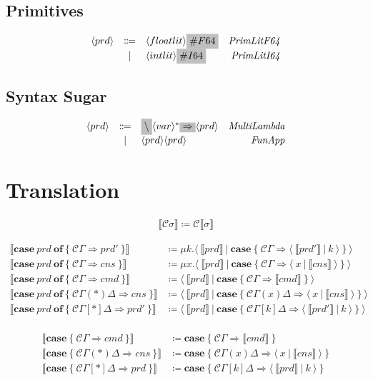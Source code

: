 \documentclass[11pt]{article}
\newcommand{\translate}[1]{\llbracket #1 \rrbracket}
\newcommand{\C}{\mathcal{C}}
\newcommand{\case}[1]{\mathbf{case}\ \{\ #1\ \}}
\newcommand{\caseof}[2]{\mathbf{case}\ #1\ \mathbf{of}\ \{\ #2\ \}}
\newcommand{\pat}[1]{\C\Gamma \Rightarrow #1 }
\newcommand{\prdpat}[2]{\C\Gamma(#1)\Delta \Rightarrow #2 }
\newcommand{\cnspat}[2]{\C\Gamma[#1]\Delta \Rightarrow #2 }
\newcommand{\nonterminal}[1]{\langle #1 \rangle}
\newcommand{\terminal}[1]{\colorbox{lightgray}{#1}}
\newcommand{\cut}[2]{\langle\ #1\ |\ #2\ \rangle}
\begin{document}
\subsection{Primitives}
\[
  \begin{array}{lclr}
    \nonterminal{prd} & \Coloneqq & \nonterminal{floatlit}\terminal{$\#F64$} & \emph{PrimLitF64} \\
    & | & \nonterminal{intlit}\terminal{$\#I64$} & \emph{PrimLitI64}
  \end{array}
\]
\subsection{Syntax Sugar}

\[
  \begin{array}{lclr}
    \nonterminal{prd} & \Coloneqq & \terminal{$\backslash$} \nonterminal{var}^{\ast}\terminal{$\Rightarrow$} \nonterminal{prd} & \emph{MultiLambda} \\
    & | & \nonterminal{prd} \nonterminal{prd} & \emph{FunApp}
  \end{array}
\]

\section{Translation}

\begin{align*}
  \translate{\C\sigma} \coloneqq \C\translate{\sigma}
\end{align*}

\begin{align*}
  \translate{\caseof{prd}{\pat{prd'}}} &\coloneqq \mu k.\cut{\translate{prd}}{\case{\pat{\cut{\translate{prd'}}{k}}}}\\
  \translate{\caseof{prd}{\pat{cns}}} &\coloneqq \mu x.\cut{\translate{prd}}{\case{\pat{\cut{x}{\translate{cns}}}}}\\
  \translate{\caseof{prd}{\pat{cmd}}} &\coloneqq \cut{\translate{prd}}{\case{\pat{\translate{cmd}}}}\\
  \translate{\caseof{prd}{\prdpat{*}{cns}}} &\coloneqq \cut{\translate{prd}}{\case{\prdpat{x}{\cut{x}{\translate{cns}}}}} \\
  \translate{\caseof{prd}{\cnspat{*}{prd'}}} &\coloneqq \cut{\translate{prd}}{\case{\cnspat{k}{\cut{\translate{prd'}}{k}}}} \\
\end{align*}

\begin{align*}
  \translate{\case{\pat{cmd}}} &\coloneqq \case{\pat{\translate{cmd}}} \\
  \translate{\case{\prdpat{*}{cns}}} &\coloneqq \case{\prdpat{x}{\cut{x}{\translate{cns}}}} \\
  \translate{\case{\cnspat{*}{prd}}} &\coloneqq \case{\cnspat{k}{\cut{\translate{prd}}{k}}} \\
\end{align*}
\end{document}
